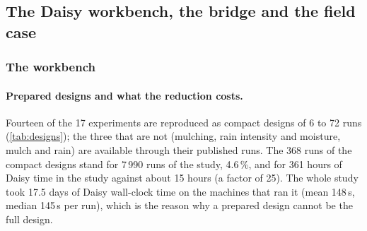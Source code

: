 \documentclass[preprint,12pt]{elsarticle}
\begin{document}
\subsection{The Daisy workbench, the bridge and the field case}\label{sec:wbresults}

\subsubsection{The workbench}
\paragraph{Prepared designs and what the reduction costs.}
Fourteen of the 17 experiments are reproduced as compact designs of 6 to 72 runs (\cref{tab:designs}); the three that are not (mulching, rain intensity and moisture, mulch and rain) are available through their published runs. The 368 runs of the compact designs stand for 7\,990 runs of the study, 4.6\,\%, and for 361 hours of Daisy time in the study against about 15 hours (a factor of 25). The whole study took 17.5 days of Daisy wall-clock time on the machines that ran it (mean 148\,s, median 145\,s per run), which is the reason why a prepared design cannot be the full design.
\end{document}
